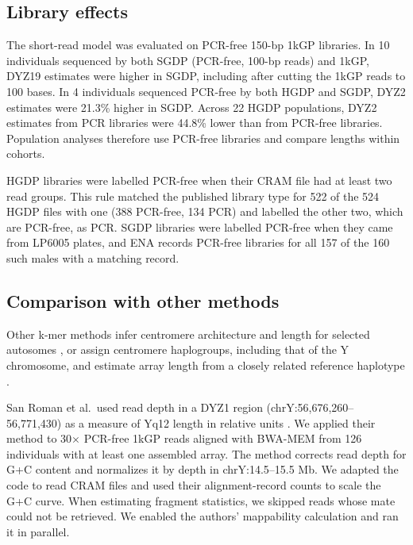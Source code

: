 \subsection{Library effects}
The short-read model was evaluated on PCR-free 150-bp 1kGP libraries. In 10 individuals sequenced by both SGDP (PCR-free, 100-bp reads) and 1kGP, DYZ19 estimates were higher in SGDP, including after cutting the 1kGP reads to 100 bases. In 4 individuals sequenced PCR-free by both HGDP and SGDP, DYZ2 estimates were 21.3\% higher in SGDP. Across 22 HGDP populations, DYZ2 estimates from PCR libraries were 44.8\% lower than from PCR-free libraries. Population analyses therefore use PCR-free libraries and compare lengths within cohorts.

HGDP libraries were labelled PCR-free when their CRAM file had at least two read groups. This rule matched the published library type \cite{Bergstrom2020} for 522 of the 524 HGDP files with one (388 PCR-free, 134 PCR) and labelled the other two, which are PCR-free, as PCR. SGDP libraries were labelled PCR-free when they came from LP6005 plates, and ENA records PCR-free libraries for all 157 of the 160 such males with a matching record.

\subsection{Comparison with other methods}\label{sec:m-sanroman}
Other k-mer methods infer centromere architecture and length for selected autosomes \cite{Hain2026}, or assign centromere haplogroups, including that of the Y chromosome, and estimate array length from a closely related reference haplotype \cite{Shiraishi2026}.

San Roman et al.\ used read depth in a DYZ1 region (chrY:56,676,260--56,771,430) as a measure of Yq12 length in relative units \cite{SanRoman2024}. We applied their method to 30$\times$ PCR-free 1kGP reads aligned with BWA-MEM \cite{Li2013} from 126 individuals with at least one assembled array. The method corrects read depth for G+C content \cite{Teitz2018} and normalizes it by depth in chrY:14.5--15.5 Mb. We adapted the code to read CRAM files and used their alignment-record counts to scale the G+C curve. When estimating fragment statistics, we skipped reads whose mate could not be retrieved. We enabled the authors' mappability calculation and ran it in parallel.

